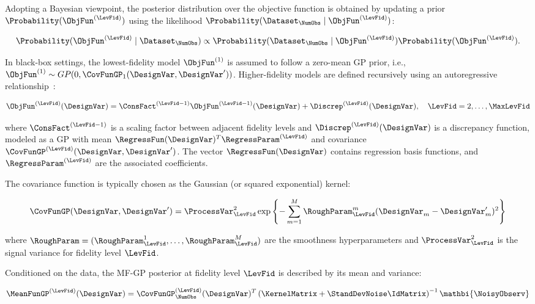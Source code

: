 Adopting a Bayesian viewpoint, the posterior distribution over the objective function is obtained by updating a prior $\Probability(\ObjFun^{(\LevFid)})$ using the likelihood $\Probability(\Dataset_{\NumObs} \mid \ObjFun^{(\LevFid)})$:

\[
\Probability( \ObjFun^{(\LevFid)} \mid \Dataset_{\NumObs}) \propto \Probability(\Dataset_{\NumObs} \mid \ObjFun^{(\LevFid)}) \Probability(\ObjFun^{(\LevFid)}).
\]

In black-box settings, the lowest-fidelity model $\ObjFun^{(1)}$ is assumed to follow a zero-mean GP prior, i.e., $\ObjFun^{(1)} \sim GP(0, \CovFunGP_1(\DesignVar, \DesignVar'))$. Higher-fidelity models are defined recursively using an autoregressive relationship~\cite{kennedy2000predicting}:

\begin{equation}\label{e:MFGP1}
    \ObjFun^{(\LevFid)}(\DesignVar) = \ConsFact^{(\LevFid-1)} \ObjFun^{(\LevFid - 1)}(\DesignVar) + \Discrep^{(\LevFid)}(\DesignVar), \quad \LevFid = 2, \dots, \MaxLevFid
\end{equation}

\noindent where $\ConsFact^{(\LevFid-1)}$ is a scaling factor between adjacent fidelity levels and $\Discrep^{(\LevFid)}(\DesignVar)$ is a discrepancy function, modeled as a GP with mean $\RegressFun(\DesignVar)^T \RegressParam^{(\LevFid)}$ and covariance $\CovFunGP^{(\LevFid)}(\DesignVar, \DesignVar')$. The vector $\RegressFun(\DesignVar)$ contains regression basis functions, and $\RegressParam^{(\LevFid)}$ are the associated coefficients.

The covariance function is typically chosen as the Gaussian (or squared exponential) kernel:

\begin{equation} \label{eq:kernelfunc} 
    \CovFunGP(\DesignVar, \DesignVar') = \ProcessVar^2_{\LevFid} \exp \left\{ - \sum_{m=1}^{M} \RoughParam^m_{\LevFid} (\DesignVar_m - \DesignVar_m')^2 \right\}
\end{equation}

\noindent where $\RoughParam = (\RoughParam^1_{\LevFid}, \ldots, \RoughParam^M_{\LevFid})$ are the smoothness hyperparameters and $\ProcessVar^2_{\LevFid}$ is the signal variance for fidelity level $\LevFid$.

Conditioned on the data, the MF-GP posterior at fidelity level $\LevFid$ is described by its mean and variance:

\begin{equation}\label{e:MFGP2}
    \MeanFunGP^{(\LevFid)} (\DesignVar) = \CovFunGP_\NumObs^{(\LevFid)}(\DesignVar)^T \left(\KernelMatrix + \StandDevNoise \IdMatrix \right)^{-1} \mathbi{\NoisyObserv}
\end{equation}

